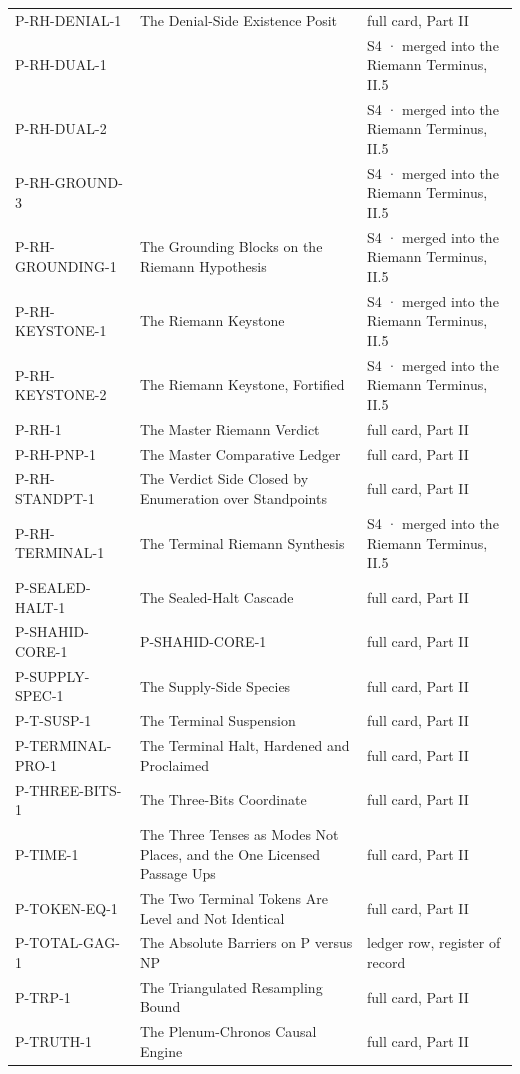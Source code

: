 \documentclass[10pt,twocolumn]{article}
\begin{document}
\begin{center}
\begin{longtable}{>{\raggedright\arraybackslash}p{}>{\raggedright\arraybackslash}p{}>{\raggedright\arraybackslash}p{}}
P-RH-DENIAL-1 & The Denial-Side Existence Posit & full card, Part II \\
P-RH-DUAL-1 &  & S4 · merged into the Riemann Terminus, II.5 \\
P-RH-DUAL-2 &  & S4 · merged into the Riemann Terminus, II.5 \\
P-RH-GROUND-3 &  & S4 · merged into the Riemann Terminus, II.5 \\
P-RH-GROUNDING-1 & The Grounding Blocks on the Riemann Hypothesis & S4 · merged into the Riemann Terminus, II.5 \\
P-RH-KEYSTONE-1 & The Riemann Keystone & S4 · merged into the Riemann Terminus, II.5 \\
P-RH-KEYSTONE-2 & The Riemann Keystone, Fortified & S4 · merged into the Riemann Terminus, II.5 \\
P-RH-1 & The Master Riemann Verdict & full card, Part II \\
P-RH-PNP-1 & The Master Comparative Ledger & full card, Part II \\
P-RH-STANDPT-1 & The Verdict Side Closed by Enumeration over Standpoints & full card, Part II \\
P-RH-TERMINAL-1 & The Terminal Riemann Synthesis & S4 · merged into the Riemann Terminus, II.5 \\
P-SEALED-HALT-1 & The Sealed-Halt Cascade & full card, Part II \\
P-SHAHID-CORE-1 & [codex home: §IV/§XVIII] P-SHAHID-CORE-1 & full card, Part II \\
P-SUPPLY-SPEC-1 & The Supply-Side Species & full card, Part II \\
P-T-SUSP-1 & The Terminal Suspension & full card, Part II \\
P-TERMINAL-PRO-1 & The Terminal Halt, Hardened and Proclaimed & full card, Part II \\
P-THREE-BITS-1 & The Three-Bits Coordinate & full card, Part II \\
P-TIME-1 & The Three Tenses as Modes Not Places, and the One Licensed Passage Ups & full card, Part II \\
P-TOKEN-EQ-1 & The Two Terminal Tokens Are Level and Not Identical & full card, Part II \\
P-TOTAL-GAG-1 & The Absolute Barriers on P versus NP & ledger row, register of record \\
P-TRP-1 & The Triangulated Resampling Bound & full card, Part II \\
P-TRUTH-1 & The Plenum-Chronos Causal Engine & full card, Part II \\

\end{longtable}
\end{center}
\end{document}
